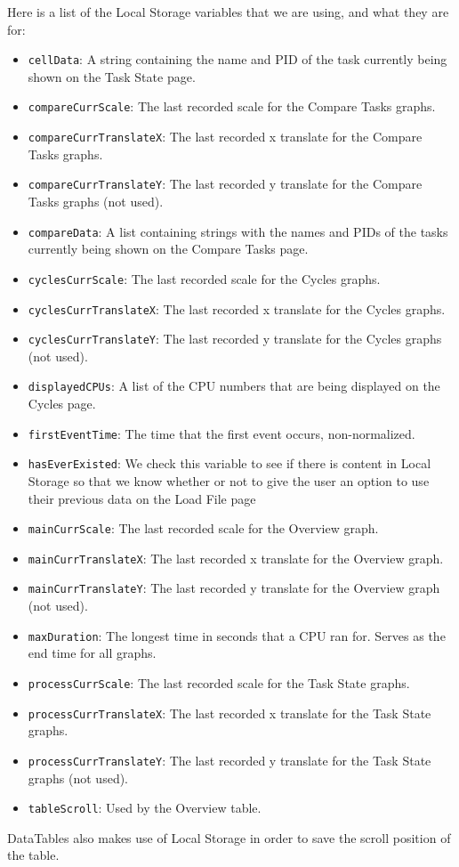 \documentclass{hmcclinic}
\begin{document}
Here is a list of the Local Storage variables that we are using, and what they are for:
\begin{itemize}
  \item \texttt{cellData}: A string containing the name and PID of the task currently being
  shown on the Task State page. 
\item \texttt{compareCurrScale}: The last recorded scale for the Compare Tasks graphs.
\item \texttt{compareCurrTranslateX}: The last recorded x translate for the Compare Tasks
  graphs.
\item \texttt{compareCurrTranslateY}: The last recorded y translate for the Compare Tasks
  graphs (not used).
\item \texttt{compareData}: A list containing strings with the names and PIDs of the
  tasks currently being shown on the Compare Tasks page.
\item \texttt{cyclesCurrScale}: The last recorded scale for the Cycles graphs.	
\item \texttt{cyclesCurrTranslateX}: The last recorded x translate for the Cycles graphs.
\item \texttt{cyclesCurrTranslateY}: The last recorded y translate for the Cycles graphs
  (not used).
\item \texttt{displayedCPUs}: A list of the CPU numbers that are being displayed on the
  Cycles page.
\item \texttt{firstEventTime}: The time that the first event occurs, non-normalized.
\item \texttt{hasEverExisted}: We check this variable to see if there is content in Local Storage so that we know whether or not to give the user an option to use their previous data on the Load File page	
\item \texttt{mainCurrScale}: The last recorded scale for the Overview graph.	
\item \texttt{mainCurrTranslateX}: The last recorded x translate for the Overview graph.
\item \texttt{mainCurrTranslateY}: The last recorded y translate for the Overview graph
  (not used).
\item \texttt{maxDuration}: The longest time in seconds that a CPU ran for. Serves as
  the end time for all graphs.
\item \texttt{processCurrScale}: The last recorded scale for the Task State graphs.
\item \texttt{processCurrTranslateX}: The last recorded x translate for the Task State
  graphs.
\item \texttt{processCurrTranslateY}: The last recorded y translate for the Task State
  graphs (not used).
\item \texttt{tableScroll}: Used by the Overview table.
\end{itemize}
DataTables also makes use of Local Storage in order to save the scroll position of the table.
\end{document}

